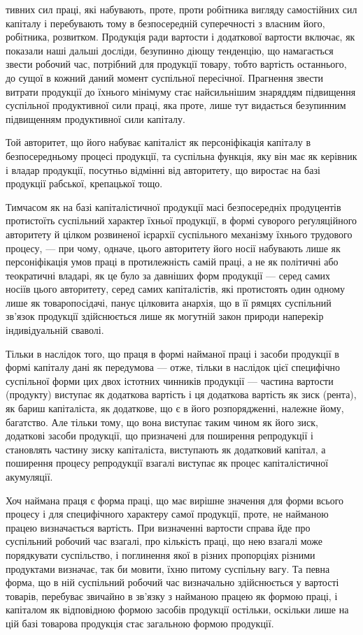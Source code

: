 \parcont{}  %
тивних сил праці, які набувають, проте, проти робітника вигляду самостійних
сил капіталу і перебувають тому в безпосередній суперечності з власним його,
робітника, розвитком. Продукція ради вартости і додаткової вартости включає,
як показали наші дальші досліди, безупинно діющу тенденцію, що намагається
звести робочий час, потрібний для продукції товару, тобто вартість останнього,
до сущої в кожний даний момент суспільної пересічної. Прагнення звести витрати
продукції до їхнього мінімуму стає найсильнішим знаряддям підвищення
суспільної продуктивної сили праці, яка проте, лише тут видається безупинним
підвищенням продуктивної сили капіталу.

Той авторитет, що його набуває капіталіст як персоніфікація капіталу в
безпосередньому процесі продукції, та суспільна функція, яку він має як керівник
і владар продукції, посутньо відмінні від авторитету, що виростає на базі
продукції рабської, крепацької тощо.

Тимчасом як на базі капіталістичної продукції масі безпосередніх продуцентів
протистоїть суспільний характер їхньої продукції, в формі суворого реґуляційного
авторитету й цілком розвиненої ієрархії суспільного механізму їхнього
трудового процесу, — при чому, одначе, цього авторитету його носії набувають
лише як персоніфікація умов праці в протилежність самій праці, а не як політичні
або теократичні владарі, як це було за давніших форм продукції — серед
самих носіїв цього авторитету, серед самих капіталістів, які протистоять один
одному лише як товаропосідачі, панує цілковита анархія, що в її рямцях суспільний
зв’язок продукції здійснюється лише як могутній закон природи наперекір
індивідуальній сваволі.

Тільки в наслідок того, що праця в формі найманої праці і засоби продукції
в формі капіталу дані як передумова — отже, тільки в наслідок цієї специфічно
суспільної форми цих двох істотних чинників продукції — частина вартости
(продукту) виступає як додаткова вартість і ця додаткова вартість як
зиск (рента), як бариш капіталіста, як додаткове, що є в його розпорядженні,
належне йому, багатство. Але тільки тому, що вона виступає таким чином як
його зиск, додаткові засоби продукції, що призначені для поширення репродукції
і становлять частину зиску капіталіста, виступають як додатковий капітал,
а поширення процесу репродукції взагалі виступає як процес капіталістичної
акумуляції.

Хоч наймана праця є форма праці, що має вирішне значення для
форми всього процесу і для специфічного характеру самої продукції, проте,
не найманою працею визначається вартість. При визначенні вартости справа
йде про суспільний робочий час взагалі, про кількість праці, що нею взагалі
може порядкувати суспільство, і поглинення якої в різних пропорціях різними
продуктами визначає, так би мовити, їхню питому суспільну вагу. Та певна форма,
що в ній суспільний робочий час визначально здійснюється у вартості товарів,
перебуває звичайно в зв’язку з найманою працею як формою праці, і капіталом
як відповідною формою засобів продукції остільки, оскільки лише на цій базі
товарова продукція стає загальною формою продукції.

